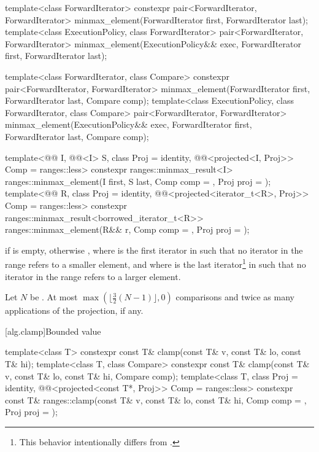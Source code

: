 %
\begin{itemdecl}
template<class ForwardIterator>
  constexpr pair<ForwardIterator, ForwardIterator>
    minmax_element(ForwardIterator first, ForwardIterator last);
template<class ExecutionPolicy, class ForwardIterator>
  pair<ForwardIterator, ForwardIterator>
    minmax_element(ExecutionPolicy&& exec,
                   ForwardIterator first, ForwardIterator last);

template<class ForwardIterator, class Compare>
  constexpr pair<ForwardIterator, ForwardIterator>
    minmax_element(ForwardIterator first, ForwardIterator last, Compare comp);
template<class ExecutionPolicy, class ForwardIterator, class Compare>
  pair<ForwardIterator, ForwardIterator>
    minmax_element(ExecutionPolicy&& exec,
                   ForwardIterator first, ForwardIterator last, Compare comp);

template<@@ I, @@<I> S, class Proj = identity,
         @@<projected<I, Proj>> Comp = ranges::less>
  constexpr ranges::minmax_result<I>
    ranges::minmax_element(I first, S last, Comp comp = {}, Proj proj = {});
template<@@ R, class Proj = identity,
         @@<projected<iterator_t<R>, Proj>> Comp = ranges::less>
  constexpr ranges::minmax_result<borrowed_iterator_t<R>>
    ranges::minmax_element(R&& r, Comp comp = {}, Proj proj = {});
\end{itemdecl}


\begin{itemdescr}
\pnum
\returns
{} if  is empty, otherwise
, where  is
the first iterator in  such that no iterator in the range refers
to a smaller element, and where  is the last iterator\footnote{This behavior
intentionally differs from .}
in  such that no iterator in the range refers to a larger element.

\pnum
\complexity
Let $N$ be .
At most $\max(\bigl\lfloor{\frac{3}{2}} (N-1)\bigr\rfloor, 0)$ comparisons and
twice as many applications of the projection, if any.
\end{itemdescr}

[alg.clamp]{Bounded value}

%
\begin{itemdecl}
template<class T>
  constexpr const T& clamp(const T& v, const T& lo, const T& hi);
template<class T, class Compare>
  constexpr const T& clamp(const T& v, const T& lo, const T& hi, Compare comp);
template<class T, class Proj = identity,
         @@<projected<const T*, Proj>> Comp = ranges::less>
  constexpr const T&
    ranges::clamp(const T& v, const T& lo, const T& hi, Comp comp = {}, Proj proj = {});
\end{itemdecl}

